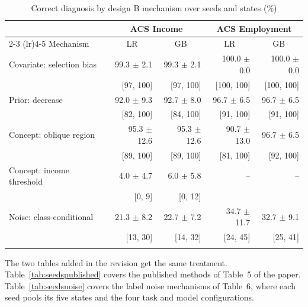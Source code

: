\documentclass[pdflatex,sn-basic]{sn-jnl}
\begin{document}
\begin{table}[!htbp]\centering\tablebodyfont
\caption{Correct diagnosis by design B mechanism over seeds and states (\%)}\label{tab:seedsmechanisms}%
\begin{tabular}{@{}lrrrr@{}}
\toprule
 & \multicolumn{2}{c}{ACS Income} & \multicolumn{2}{c}{ACS Employment} \\
\cmidrule(lr){2-3}
\cmidrule(lr){4-5}
Mechanism & \multicolumn{1}{c}{LR} & \multicolumn{1}{c}{GB} & \multicolumn{1}{c}{LR} & \multicolumn{1}{c}{GB} \\
\midrule
Covariate: selection bias & 99.3 $\pm$ 2.1 & 99.3 $\pm$ 2.1 & 100.0 $\pm$ 0.0 & 100.0 $\pm$ 0.0 \\
 & [97, 100] & [97, 100] & [100, 100] & [100, 100] \\
Prior: decrease & 92.0 $\pm$ 9.3 & 92.7 $\pm$ 8.0 & 96.7 $\pm$ 6.5 & 96.7 $\pm$ 6.5 \\
 & [82, 100] & [84, 100] & [91, 100] & [91, 100] \\
Concept: oblique region & 95.3 $\pm$ 12.6 & 95.3 $\pm$ 12.6 & 90.7 $\pm$ 13.0 & 96.7 $\pm$ 6.5 \\
 & [89, 100] & [89, 100] & [81, 100] & [92, 100] \\
Concept: income threshold & 4.0 $\pm$ 4.7 & 6.0 $\pm$ 5.8 & -- & -- \\
 & [0, 9] & [0, 12] &  &  \\
Noise: class-conditional & 21.3 $\pm$ 8.2 & 22.7 $\pm$ 7.2 & 34.7 $\pm$ 11.7 & 32.7 $\pm$ 9.1 \\
 & [13, 30] & [14, 32] & [24, 45] & [25, 41] \\
\botrule
\end{tabular}
\end{table}

The two tables added in the revision get the same treatment. Table~\ref{tab:seedspublished} covers the published methods of Table~5 of the paper. Table~\ref{tab:seedsnoise} covers the label noise mechanisms of Table~6, where each seed pools its five states and the four task and model configurations.
\end{document}
